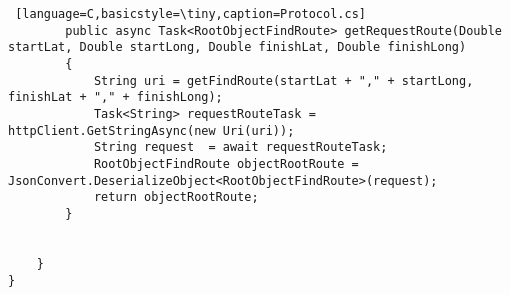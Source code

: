 \begin{lstlisting} [language=C,basicstyle=\tiny,caption=Protocol.cs]
        public async Task<RootObjectFindRoute> getRequestRoute(Double startLat, Double startLong, Double finishLat, Double finishLong)
        {
            String uri = getFindRoute(startLat + "," + startLong, finishLat + "," + finishLong);
            Task<String> requestRouteTask = httpClient.GetStringAsync(new Uri(uri));
            String request  = await requestRouteTask;
            RootObjectFindRoute objectRootRoute = JsonConvert.DeserializeObject<RootObjectFindRoute>(request);
            return objectRootRoute;
        }


    }
}
\end{lstlisting}